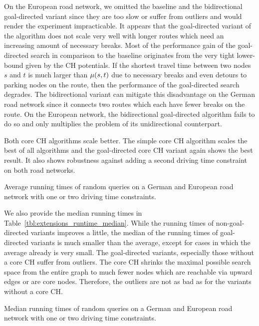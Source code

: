 On the European road network, we omitted the baseline and the bidirectional goal-directed variant since they are too slow or suffer from outliers and would render the experiment impracticable. It appears that the goal-directed variant of the algorithm does not scale very well with longer routes which need an increasing amount of necessary breaks. Most of the performance gain of the goal-directed search in comparison to the baseline originates from the very tight lower-bound given by the CH potentials. If the shortest travel time between two nodes $s$ and $t$ is much larger than $\mu(s,t)$ due to necessary breaks and even detours to parking nodes on the route, then the performance of the goal-directed search degrades. The bidirectional variant can mitigate this disadvantage on the German road network since it connects two routes which each have fewer breaks on the route. On the European network, the bidirectional goal-directed algorithm fails to do so and only multiplies the problem of its unidirectional counterpart.

Both core CH algorithms scale better. The simple core CH algorithm scales the best of all algorithms and the goal-directed core CH variant again shows the best result. It also shows robustness against adding a second driving time constraint on both road networks.

\begin{table}[hbtp]
	\centering
	
	\caption{Average running times of random queries on a German and European road network with one or two driving time constraints.}
	\label{tbl:extensions_runtime}
\end{table}

We also provide the median running times in Table~\ref{tbl:extensions_runtime_median}. While the running times of non-goal-directed variants improves a little, the median of the running times of goal-directed variants is much smaller than the average, except for cases in which the average already is very small. The goal-directed variants, especially those without a core CH suffer from outliers. The core CH shrinks the maximal possible search space from the entire graph to much fewer nodes which are reachable via upward edges or are core nodes. Therefore, the outliers are not as bad as for the variants without a core CH.

\begin{table}[hbtp]
	\centering
	
	\caption{Median running times of random queries on a German and European road network with one or two driving time constraints.}
	\label{tbl:extensions_runtime_median}
\end{table}

